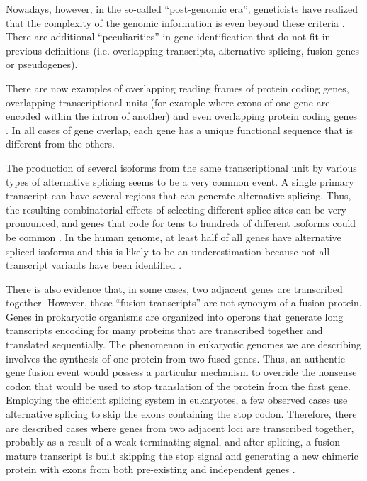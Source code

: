 Nowadays, however, in the so-called ``post-genomic era'', geneticists
have realized that the complexity of the genomic information is even
beyond these criteria \citep{snyder:2003a}. There are additional
``peculiarities'' in gene identification that do not fit in previous
definitions (i.e. overlapping transcripts, alternative splicing,
fusion genes or pseudogenes).

There are now examples of overlapping reading frames of protein coding
genes, overlapping transcriptional units (for example where exons of
one gene are encoded within the intron of another) and even
overlapping protein coding genes \citep{coelho:2002a,tycowski:1996a}.
In all cases of gene overlap, each gene has a unique functional
sequence that is different from the others.

The production of several isoforms from the same transcriptional unit
by various types of alternative splicing seems to be a very common
event. A single primary transcript can have several regions that can
generate alternative splicing. Thus, the resulting combinatorial
effects of selecting different splice sites can be very pronounced,
and genes that code for tens to hundreds of different isoforms could
be common \citep{graveley:2001a}. In the human genome, at least half
of all genes have alternative spliced isoforms and this is likely to
be an underestimation because not all transcript variants have been
identified \citep{modrek:2002a}.

There is also evidence that, in some cases, two adjacent genes are
transcribed together. However, these ``fusion transcripts'' are not
synonym of a fusion protein. Genes in prokaryotic organisms are
organized into operons that generate long transcripts encoding for
many proteins that are transcribed together and translated
sequentially. The phenomenon in eukaryotic genomes we are describing
involves the synthesis of one protein from two fused genes. Thus, an
authentic gene fusion event would possess a particular mechanism to
override the nonsense codon that would be used to stop translation of
the protein from the first gene. Employing the efficient splicing
system in eukaryotes, a few observed cases use alternative splicing to
skip the exons containing the stop codon. Therefore, there are
described cases where genes from two adjacent loci are transcribed
together, probably as a result of a weak terminating signal, and after
splicing, a fusion mature transcript is built skipping the stop signal
and generating a new chimeric protein with exons from both
pre-existing and independent genes \citep{thomson:2000a,poulin:2003a}.

